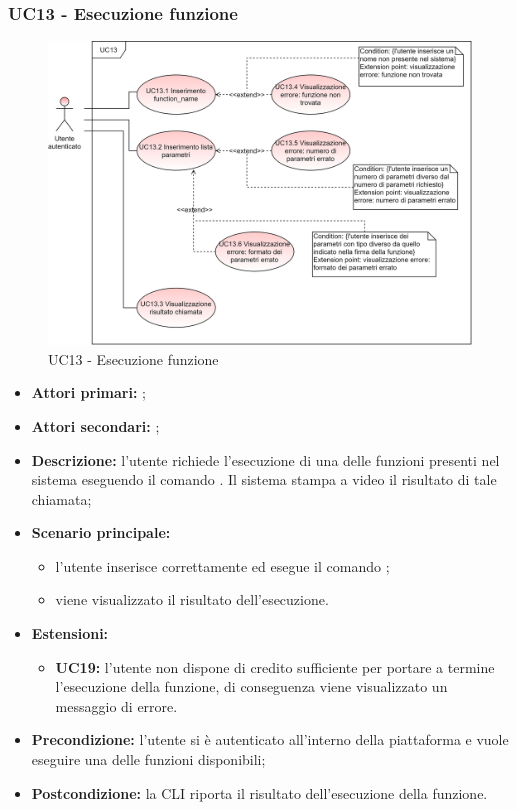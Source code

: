 \subsubsection{UC13 - Esecuzione funzione}
\begin{figure}[h]
	\centering
	\includegraphics[scale=\ucs]{./res/img/UC13.png}
	\caption {UC13 - Esecuzione funzione}
\end{figure}
\begin{itemize}
	\item \textbf{Attori primari:} \ua{};
	\item \textbf{Attori secondari:} \re{};
	\item \textbf{Descrizione:} l’utente richiede l’esecuzione di una delle funzioni presenti nel sistema eseguendo il comando \prun{}. Il sistema stampa a video il risultato di tale chiamata; 
	\item \textbf{Scenario principale:} 
	\begin{itemize}
		\item l'utente inserisce correttamente ed esegue il comando \prun{}; 
		\item viene visualizzato il risultato dell’esecuzione. 
	\end{itemize}
	\item \textbf{Estensioni:} 
	\begin{itemize}
		\item \textbf{UC19:} l’utente non dispone di credito sufficiente per portare a termine l’esecuzione della funzione, di conseguenza viene visualizzato un messaggio di errore.
	\end{itemize}
	\item \textbf{Precondizione:} l’utente si è autenticato all’interno della piattaforma e vuole eseguire una delle funzioni disponibili;
	\item \textbf{Postcondizione:} la CLI riporta il risultato dell’esecuzione della funzione. 
\end{itemize}